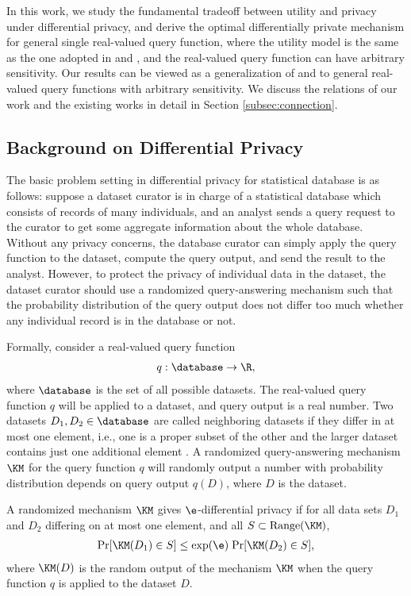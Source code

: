 In this work, we study the fundamental tradeoff between utility and privacy under differential privacy, and derive the optimal differentially private mechanism for  general single real-valued query function, where the utility model is the same as the one adopted in \cite{Ghosh09} and \cite{minimax10}, and the real-valued query function can have arbitrary sensitivity.  Our results can be viewed as a generalization of  \cite{Ghosh09} and \cite{minimax10} to general real-valued query functions with arbitrary sensitivity. We discuss the relations of our work and the existing works in detail in Section \ref{subsec:connection}.



\subsection{Background on Differential Privacy}

The basic problem setting in differential privacy for statistical database is as follows: suppose a dataset curator is in charge of a statistical database which consists of records of many individuals, and an analyst sends a query request to the curator to get some aggregate information about the whole database. Without any privacy concerns, the database curator can simply apply the query function to the dataset, compute the query output, and send the result to the analyst. However, to protect the privacy of individual data in the dataset, the dataset curator should use a randomized query-answering mechanism such that the probability distribution of the query output does not differ too much whether any individual record is in the database or not.

Formally, consider a real-valued query function
\begin{align}
	q: \database \rightarrow \R,
\end{align}
where $\database$ is the set of all possible datasets. The real-valued query function $q$ will be applied to a dataset, and query output is a real number. Two datasets $D_1, D_2 \in \database$ are called neighboring datasets if they differ in at most one element, i.e.,  one is a proper subset of the other and the larger dataset contains just one additional element \cite{DPsurvey}. A randomized query-answering mechanism $\KM$ for the query function $q$ will randomly output a number with probability distribution depends on query output $q(D)$, where $D$ is the dataset.

\begin{definition}
	A randomized mechanism $\KM$ gives $\e$-differential privacy if for all data sets $D_1$ and $D_2$ differing on at most one element, and all $S \subset \text{Range}(\KM)$,
	\begin{align}
	 	\text{Pr}[\KM(D_1) \in S] \le \exp(\e) \;  \text{Pr}[\KM(D_2) \in S], \label{eqn:dpgeneral}
	 \end{align}
	 where $\KM(D)$ is the random output of the  mechanism $\KM$ when the query function $q$ is applied to the dataset $D$.
\end{definition}


